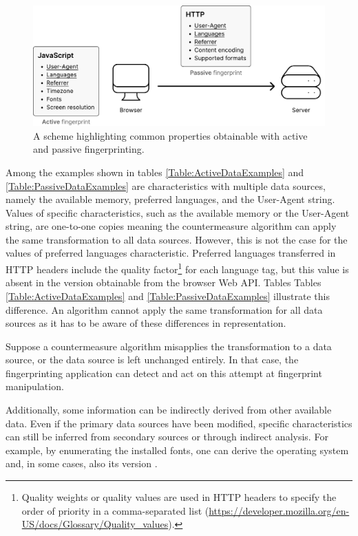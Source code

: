 \begin{figure}[h]
    \centering
    \includegraphics[width=\textwidth]{obrazky-figures/inconsistencies_schema}
    \caption{A scheme highlighting common properties obtainable with active and passive fingerprinting.}
    \label{fig:mesh1}
\end{figure}

Among the examples shown in tables \ref{Table:ActiveDataExamples} and \ref{Table:PassiveDataExamples} are characteristics with multiple data sources, namely the available memory, preferred languages, and the User-Agent string. Values of specific characteristics, such as the available memory or the User-Agent string, are one-to-one copies meaning the countermeasure algorithm can apply the same transformation to all data sources. However, this is not the case for the values of preferred languages characteristic. Preferred languages transferred in HTTP headers include the quality factor\footnote{Quality weights or quality values are used in HTTP headers to specify the order of priority in a comma-separated list (\url{https://developer.mozilla.org/en-US/docs/Glossary/Quality_values}).} for each language tag, but this value is absent in the version obtainable from the browser Web API. Tables Tables \ref{Table:ActiveDataExamples} and \ref{Table:PassiveDataExamples} illustrate this difference. An algorithm cannot apply the same transformation for all data sources as it has to be aware of these differences in representation.

Suppose a countermeasure algorithm misapplies the transformation to a data source, or the data source is left unchanged entirely. In that case, the fingerprinting application can detect and act on this attempt at fingerprint manipulation.

Additionally, some information can be indirectly derived from other available data. Even if the primary data sources have been modified, specific characteristics can still be inferred from secondary sources or through indirect analysis. For example, by enumerating the installed fonts, one can derive the operating system and, in some cases, also its version \cite{JSTemplateAttacks}.

